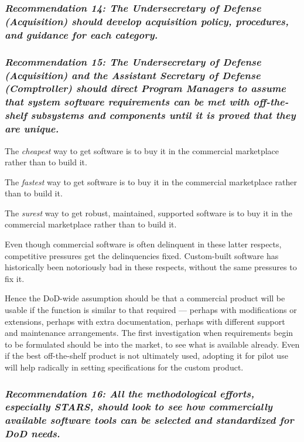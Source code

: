 \documentclass[12pt]{article}
\begin{document}

\subsubsection*{\textit{Recommendation 14: The Undersecretary of Defense
(Acquisition) should develop acquisition policy, procedures, and guidance for
each category.}}

\subsubsection*{\textit{Recommendation 15: The Undersecretary of Defense
(Acquisition) and the Assistant Secretary of Defense (Comptroller) should
direct Program Managers to assume that system software requirements can be met
with off-the-shelf subsystems and components until it is proved that they are
unique.}}

The \emph{cheapest} way to get software is to buy it in the commercial
marketplace rather than to build it.

The \emph{fastest} way to get software is to buy it in the commercial
marketplace rather than to build it.

The \emph{surest} way to get robust, maintained, supported software is to buy
it in the commercial marketplace rather than to build it.

Even though commercial software is often delinquent in these latter respects,
competitive pressures get the delinquencies fixed. Custom-built software has
historically been notoriously bad in these respects, without the same pressures
to fix it.

Hence the DoD-wide assumption should be that a commercial product will be
usable if the function is similar to that required — perhaps with modifications
or extensions, perhaps with extra documentation, perhaps with different support
and maintenance arrangements.  The first investigation when requirements begin
to be formulated should be into the market, to see what is available already.
Even if the best off-the-shelf product is not ultimately used, adopting it for
pilot use will help radically in setting specifications for the custom product.

\subsubsection*{\textit{Recommendation 16: All the methodological efforts,
especially STARS, should look to see how commercially available software tools
can be selected and standardized for DoD needs.}}
\end{document}
